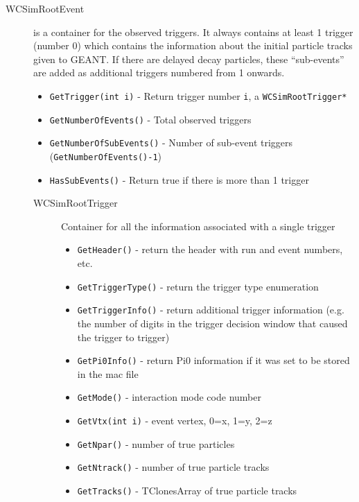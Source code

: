 \begin{description}
  \item[WCSimRootEvent] is a container for the observed triggers. It always contains at least 1 trigger (number 0) which contains the information about the initial particle tracks given to GEANT.  If there are delayed decay particles, these ``sub-events'' are added as additional triggers numbered from 1 onwards.  
  \begin{itemize}
  \item \texttt{GetTrigger(int i)} - Return trigger number \texttt{i}, a \texttt{WCSimRootTrigger*}
  \item \texttt{GetNumberOfEvents()} - Total observed triggers
  \item \texttt{GetNumberOfSubEvents()} - Number of sub-event triggers (\texttt{GetNumberOfEvents()-1})
  \item \texttt{HasSubEvents()} - Return true if there is more than 1 trigger
  \end{itemize}

  \begin{description}
    \item[WCSimRootTrigger] Container for all the information associated with a single trigger
    \begin{itemize}
    \item \texttt{GetHeader()} - return the header with run and event numbers, etc.
    \item \texttt{GetTriggerType()} - return the trigger type enumeration
    \item \texttt{GetTriggerInfo()} - return additional trigger information (e.g. the number of digits in the trigger decision window that caused the trigger to trigger)
    \item \texttt{GetPi0Info()} - return Pi0 information if it was set to be stored in the mac file
    \item \texttt{GetMode()} - interaction mode code number
    \item \texttt{GetVtx(int i)} - event vertex, 0=x, 1=y, 2=z
    \item \texttt{GetNpar()} - number of true particles

    \item \texttt{GetNtrack()} - number of true particle tracks
    \item \texttt{GetTracks()} - TClonesArray of true particle tracks


\end{itemize}
\end{description}
\end{description}

